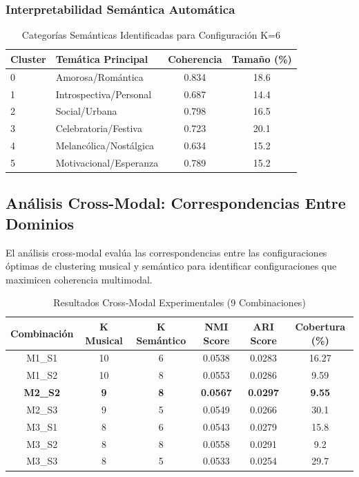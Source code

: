 \documentclass[12pt,a4paper]{article}
\begin{document}
\subsubsection{Interpretabilidad Semántica Automática}

\begin{table}[H]
\centering
\caption{Categorías Semánticas Identificadas para Configuración K=6}
\begin{tabular}{|l|l|c|c|}
\hline
\textbf{Cluster} & \textbf{Temática Principal} & \textbf{Coherencia} & \textbf{Tamaño (\%)} \\
\hline
0 & Amorosa/Romántica & 0.834 & 18.6 \\
\hline
1 & Introspectiva/Personal & 0.687 & 14.4 \\
\hline
2 & Social/Urbana & 0.798 & 16.5 \\
\hline
3 & Celebratoria/Festiva & 0.723 & 20.1 \\
\hline
4 & Melancólica/Nostálgica & 0.634 & 15.2 \\
\hline
5 & Motivacional/Esperanza & 0.789 & 15.2 \\
\hline
\end{tabular}
\end{table}

\subsection{Análisis Cross-Modal: Correspondencias Entre Dominios}

El análisis cross-modal evalúa las correspondencias entre las configuraciones óptimas de clustering musical y semántico para identificar configuraciones que maximicen coherencia multimodal.

\begin{table}[H]
\centering
\caption{Resultados Cross-Modal Experimentales (9 Combinaciones)}
\begin{tabular}{|c|c|c|c|c|c|}
\hline
\textbf{Combinación} & \textbf{K Musical} & \textbf{K Semántico} & \textbf{NMI Score} & \textbf{ARI Score} & \textbf{Cobertura (\%)} \\
\hline
M1\_S1 & 10 & 6 & 0.0538 & 0.0283 & 16.27 \\
\hline
M1\_S2 & 10 & 8 & 0.0553 & 0.0286 & 9.59 \\
\hline
\textbf{M2\_S2} & \textbf{9} & \textbf{8} & \textbf{0.0567} & \textbf{0.0297} & \textbf{9.55} \\
\hline
M2\_S3 & 9 & 5 & 0.0549 & 0.0266 & 30.1 \\
\hline
M3\_S1 & 8 & 6 & 0.0543 & 0.0279 & 15.8 \\
\hline
M3\_S2 & 8 & 8 & 0.0558 & 0.0291 & 9.2 \\
\hline
M3\_S3 & 8 & 5 & 0.0533 & 0.0254 & 29.7 \\
\hline
\end{tabular}
\end{table}
\end{document}
